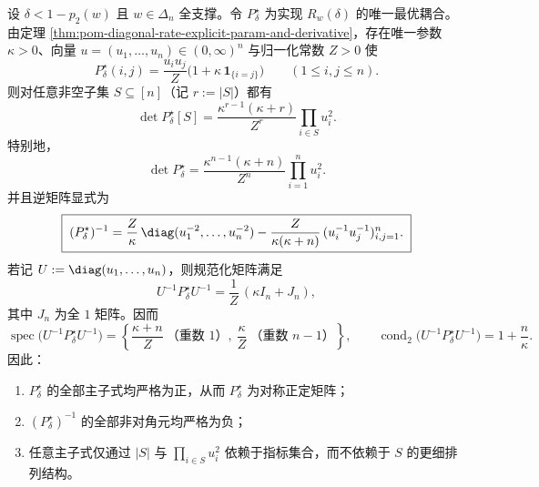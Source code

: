 \begin{theorem}\label{thm:conclusion-diagonal-rate-optimal-coupling-principal-minor-inverse}
设 \(\delta<1-p_2(w)\) 且 \(w\in\Delta_n\) 全支撑。令 \(P_\delta^\star\) 为实现 \(R_w(\delta)\) 的唯一最优耦合。由定理 \ref{thm:pom-diagonal-rate-explicit-param-and-derivative}，存在唯一参数 \(\kappa>0\)、向量 \(u=(u_1,\dots,u_n)\in(0,\infty)^n\) 与归一化常数 \(Z>0\) 使
\[
P_\delta^\star(i,j)=\frac{u_i u_j}{Z}\bigl(1+\kappa\,\mathbf 1_{\{i=j\}}\bigr)
\qquad
(1\le i,j\le n).
\]
则对任意非空子集 \(S\subseteq[n]\)（记 \(r:=|S|\)）都有
\[
\boxed{\;
\det P_\delta^\star[S]
=
\frac{\kappa^{r-1}(\kappa+r)}{Z^r}\prod_{i\in S}u_i^2.\;}
\]
特别地，
\[
\boxed{\;
\det P_\delta^\star
=
\frac{\kappa^{n-1}(\kappa+n)}{Z^n}\prod_{i=1}^{n}u_i^2.\;}
\]
并且逆矩阵显式为
\[
\boxed{\;
(P_\delta^\star)^{-1}
=
\frac{Z}{\kappa}\,\diag(u_1^{-2},\dots,u_n^{-2})
-\frac{Z}{\kappa(\kappa+n)}\,(u_i^{-1}u_j^{-1})_{i,j=1}^n.\;}
\]
若记 \(U:=\diag(u_1,\dots,u_n)\)，则规范化矩阵满足
\[
U^{-1}P_\delta^\star U^{-1}=\frac{1}{Z}\,(\kappa I_n+J_n),
\]
其中 \(J_n\) 为全 \(1\) 矩阵。因而
\[
\operatorname{spec}\!\bigl(U^{-1}P_\delta^\star U^{-1}\bigr)
=
\left\{\frac{\kappa+n}{Z}\ \text{（重数 }1\text{）},\ \frac{\kappa}{Z}\ \text{（重数 }n-1\text{）}\right\},
\qquad
\operatorname{cond}_2\!\bigl(U^{-1}P_\delta^\star U^{-1}\bigr)=1+\frac{n}{\kappa}.
\]
因此：
\begin{enumerate}
  \item \(P_\delta^\star\) 的全部主子式均严格为正，从而 \(P_\delta^\star\) 为对称正定矩阵；
  \item \((P_\delta^\star)^{-1}\) 的全部非对角元均严格为负；
  \item 任意主子式仅通过 \(|S|\) 与 \(\prod_{i\in S}u_i^2\) 依赖于指标集合，而不依赖于 \(S\) 的更细排列结构。
\end{enumerate}
\end{theorem}
